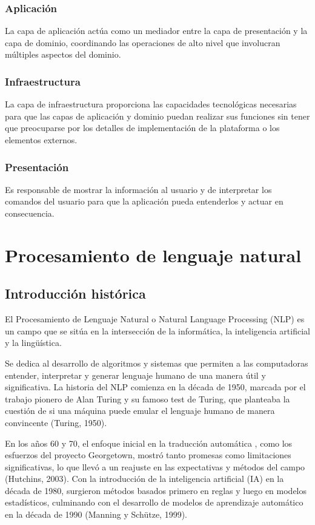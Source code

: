 \subsubsection*{Aplicación}
La capa de aplicación actúa como un mediador entre la capa de presentación y la capa de dominio, coordinando
las operaciones de alto nivel que involucran múltiples aspectos del dominio.

\subsubsection*{Infraestructura}
La capa de infraestructura proporciona las capacidades tecnológicas necesarias para que las capas de
aplicación y dominio puedan realizar sus funciones sin tener que
preocuparse por los detalles de implementación de la plataforma o los elementos externos.

\subsubsection*{Presentación}
Es responsable de mostrar la información al usuario y de interpretar los
comandos del usuario para que la aplicación pueda entenderlos y actuar en consecuencia.



\section{Procesamiento de lenguaje natural}

\subsection{Introducción histórica}
El Procesamiento de Lenguaje Natural o Natural Language Processing (NLP) es un campo que se sitúa en la
intersección de la informática, la inteligencia artificial y la lingüística.

Se dedica al desarrollo de algoritmos y sistemas que permiten a las computadoras entender, interpretar y generar
lenguaje humano de una manera útil y significativa.
La historia del NLP comienza en la década de 1950, marcada por el trabajo pionero de Alan Turing y su famoso
test de Turing, que planteaba la cuestión de si una máquina puede emular el lenguaje humano de manera convincente
(Turing, 1950).

En los años 60 y 70, el enfoque inicial en la traducción automática
, como los esfuerzos del proyecto Georgetown, mostró tanto promesas como limitaciones significativas, lo que llevó a un
reajuste en las expectativas y métodos del campo (Hutchins, 2003).
Con la introducción de la inteligencia artificial (IA) en la década de 1980, surgieron métodos basados primero en reglas
y luego en modelos
estadísticos, culminando con el desarrollo de modelos de aprendizaje automático en la década de 1990 (Manning y Schütze,
1999).

